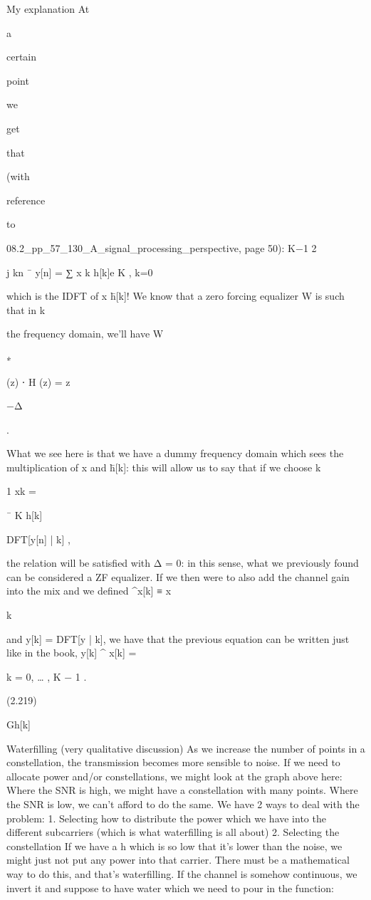 {My explanation At

a

certain

point

we

get

that

(with

reference

to

08.2_pp_57_130_A_signal_processing_perspective, page 50):
K−1 2\pi

j kn
¯
y[n] = ∑ x k h[k]e K
,
k=0

which is the IDFT of x h̄[k]! We know that a zero forcing equalizer W is such that in k

the frequency domain, we'll have W

∗

(z) ⋅ H (z) = z

−Δ

.

What we see here is that we have a dummy frequency domain which sees the multiplication of x and h̄[k]: this will allow us to say that if we choose k

1 xk =

¯
K h[k]

DFT[y[n] | k] ,

the relation will be satisfied with Δ = 0: in this sense, what we previously found can be considered a ZF equalizer.
If we then were to also add the channel gain \sqrtG into the mix and we defined ^x[k] ≡ x

k

and y[k] = DFT[y | k], we have that the previous equation can be written just like in the book,
y[k]
^
x[k] =

k = 0, … , K − 1 .

(2.219)

\sqrt Gh[k]

Waterfilling (very qualitative discussion)
As we increase the number of points in a constellation, the transmission becomes more sensible to noise. If we need to allocate power and/or constellations, we might look at the graph above here:
Where the SNR is high, we might have a constellation with many points.
Where the SNR is low, we can't afford to do the same.
We have 2 ways to deal with the problem:
1. Selecting how to distribute the power which we have into the different subcarriers
(which is what waterfilling is all about)
2. Selecting the constellation If we have a h which is so low that it's lower than the noise, we might just not put any power into that carrier. There must be a mathematical way to do this, and that's waterfilling.
If the channel is somehow continuous, we invert it and suppose to have water which we need to pour in the function:

}
